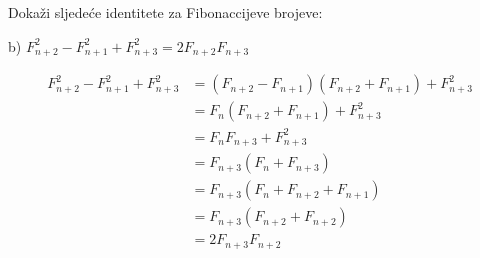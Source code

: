 \documentclass{article}
\begin{document}
	Dokaži sljedeće identitete za Fibonaccijeve brojeve:
	
	b) \( F^2_{n + 2} - F^2_{n + 1} + F^2_{n + 3} = 2 F_{n + 2} F_{n + 3} \)
	
	\begin{align*}
		F^2_{n + 2} - F^2_{n + 1} + F^2_{n + 3} &= (F_{n + 2} - F_{n + 1})(F_{n + 2} + F_{n + 1}) + F^2_{n + 3} \\
		&= F_n (F_{n + 2} + F_{n + 1}) + F^2_{n + 3} \\
		&= F_n F_{n + 3} + F^2_{n + 3} \\
		&= F_{n + 3} ( F_n + F_{n + 3} ) \\
		&= F_{n + 3} ( F_n + F_{n + 2} + F_{n + 1} ) \\
		&= F_{n + 3} ( F_{n + 2} + F_{n + 2} ) \\
		&= 2 F_{n + 3} F_{n + 2} 
	\end{align*}
\end{document}
